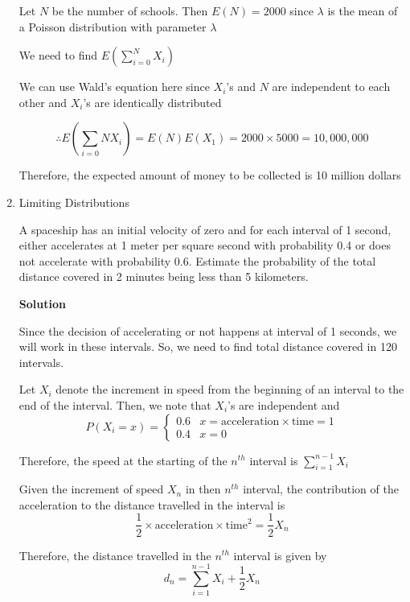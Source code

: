 \documentclass[12pt, oneside]{article}
\begin{document}
\begin{enumerate}
{    Let \(N\) be the number of schools. Then \(E(N) = 2000\) since \(\lambda\) is the mean
    of a Poisson distribution with parameter \(\lambda\)

    We need to find \(E(\sum_{i=0}^{N} X_i)\)

    We can use Wald's equation here since \(X_i\)'s and \(N\) are independent to each other
    and \(X_i\)'s are identically distributed

    \[\therefore E\left(\sum_{i=0}{N} X_i\right) = E(N) E(X_1) = 2000 \times 5000 = 10,000,000\]

    Therefore, the expected amount of money to be collected is 10 million dollars
}

\item {
    Limiting Distributions

    A spaceship has an initial velocity of zero and for each interval of 1 second,
    either accelerates at 1 meter per square second with probability 0.4 or does not 
    accelerate with probability 0.6. Estimate the probability of the total distance covered
    in 2 minutes being less than 5 kilometers.

    \textbf{Solution}

    Since the decision of accelerating or not happens at interval of 1 seconds, we will
    work in these intervals. So, we need to find total distance covered in 120 intervals.

    Let \(X_i\) denote the increment in speed from the beginning of an interval to the
    end of the interval. Then, we note that \(X_i\)'s are independent and 
    \[
        P(X_i = x) = \begin{cases}
                        0.6 & x = \text{acceleration} \times \text{time} = 1 \\
                        0.4 & x = 0
                     \end{cases}
    \]

    Therefore, the speed at the starting of the \(n^{th}\) interval is 
    \(\sum_{i=1}^{n-1} X_i\)

    Given the increment of speed \(X_n\) in then \(n^{th}\) interval, the contribution of the
    acceleration to the distance travelled in the interval is
    \[\frac{1}{2} \times \text{acceleration} \times \text{time}^2 = \frac{1}{2} X_n\]

    Therefore, the distance travelled in the \(n^{th}\) interval is given by
    \[
        d_n = \sum_{i=1}^{n-1} X_i + \frac{1}{2} X_n
    \]

}
\end{enumerate}
\end{document}
